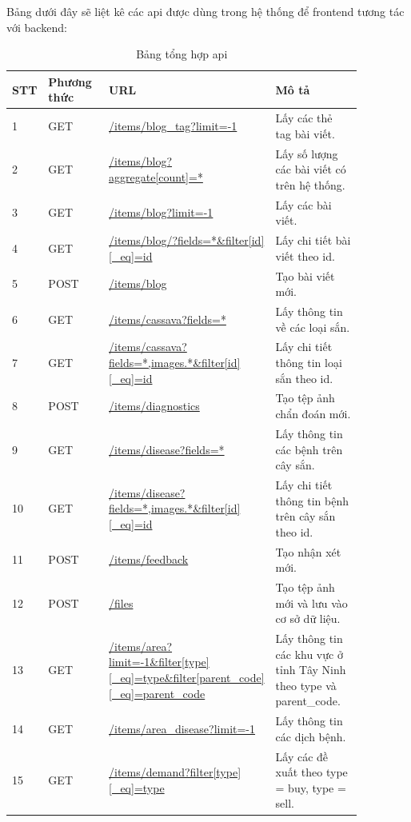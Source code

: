 \documentclass[./../main.tex]{subfiles}
\begin{document}
Bảng dưới đây sẽ liệt kê các \acrshort{api}  được dùng trong hệ thống để frontend tương tác với backend:
\begin{longtable}{| p{0.07\linewidth} | p{0.2\linewidth} | p{0.3\linewidth} | p{0.3\linewidth} |}
\caption{\label{table-api}Bảng tổng hợp \acrshort{api} } \label{list-api }
\hline
\textbf{STT} & \textbf{Phương thức} & \textbf{URL} & \textbf{Mô tả} \\ \hline 
\centerline{1} & GET & \url{/items/blog_tag?limit=-1} & Lấy các thẻ tag bài viết. \\ \hline
\centerline{2} & GET & \url{/items/blog?aggregate[count]=*} & Lấy số lượng các bài viết có trên hệ thống. \\ \hline
\centerline{3} & GET & \url{/items/blog?limit=-1} & Lấy các bài viết. \\ \hline
\centerline{4} & GET & \url{/items/blog/?fields=*&filter[id][_eq]=id} & Lấy chi tiết bài viết theo id. \\ \hline
\centerline{5} & POST & \url{/items/blog} & Tạo bài viết mới. \\ \hline
\centerline{6} & GET & \url{/items/cassava?fields=*} & Lấy thông tin về các loại sắn. \\ \hline
\centerline{7} & GET & \url{/items/cassava?fields=*,images.*&filter[id][_eq]=id} & Lấy chi tiết thông tin loại sắn theo id. \\ \hline
\centerline{8} & POST & \url{/items/diagnostics} & Tạo tệp ảnh chẩn đoán mới. \\ \hline
\centerline{9} & GET & \url{/items/disease?fields=*} & Lấy thông tin các bệnh trên cây sắn. \\ \hline
\centerline{10} & GET & \url{/items/disease?fields=*,images.*&filter[id][_eq]=id} & Lấy chi tiết thông tin bệnh trên cây sắn theo id. \\ \hline
\centerline{11} & POST & \url{/items/feedback} & Tạo nhận xét mới. \\ \hline
\centerline{12} & POST & \url{/files} & Tạo tệp ảnh mới và lưu vào cơ sở dữ liệu. \\ \hline
\centerline{13} & GET & \url{/items/area?limit=-1&filter[type][_eq]=type&filter[parent_code][_eq]=parent_code} & Lấy thông tin các khu vực ở tỉnh Tây Ninh theo type và parent\_code. \\ \hline
\centerline{14} & GET & \url{/items/area_disease?limit=-1} & Lấy thông tin các dịch bệnh. \\ \hline
\centerline{15} & GET & \url{/items/demand?filter[type][_eq]=type} & Lấy các đề xuất theo type = buy, type = sell. \\ \hline

\end{longtable}
\end{document}
